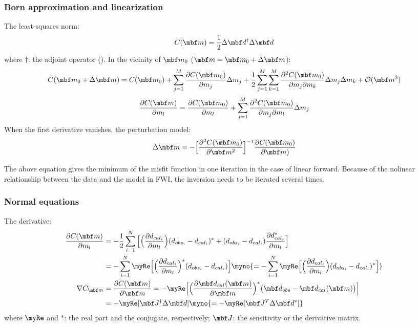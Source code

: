 \subsubsection{Born approximation and linearization}
The least-squares norm:
\[ C(\mbf m)=\frac{1}{2}\Delta\mbf d^\dagger\Delta\mbf d \]
where $\dagger$: the adjoint operator ().
In the vicinity of $\mbf m_0$ ($\mbf m=\mbf m_0+\Delta\mbf m$):
\[ C(\mbf m_0+\Delta\mbf m)=C(\mbf m_0)
  +\sum_{j=1}^M\frac{\partial C(\mbf m_0)}{\partial m_j}\Delta m_j
  +\frac{1}{2}\sum_{j=1}^M\sum_{k=1}^M\frac{\partial^2C(\mbf m_0)}{\partial m_j\partial m_k}\Delta m_j\Delta m_k
  +\mathcal O(\mbf m^3) \]
\[ \frac{\partial C(\mbf m)}{\partial m_l}=\frac{\partial C(\mbf m_0)}{\partial m_l}
  +\sum_{j=1}^M\frac{\partial^2C(\mbf m_0)}{\partial m_j\partial m_l}\Delta m_j \]
When the first derivative vanishes, the perturbation model:
\[ \Delta\mbf m=-\Big[\frac{\partial^2C(\mbf m_0)}{\partial\mbf m^2}\Big]^{-1}
  \frac{\partial C(\mbf m_0)}{\partial\mbf m)} \]

The above equation gives the minimum of the misfit function in one iteration
in the case of linear forward.
Because of the nolinear relationship between the data and the model in FWI,
the inversion needs to be iterated several times.

\subsubsection{Normal equations}
The derivative:
\begin{align*}
  \frac{\partial C(\mbf m)}{\partial m_l} & =-\frac{1}{2}\sum_{i=1}^N
      \Big[\Big(\frac{\partial d_{cal_i}}{\partial m_l}\Big)(d_{obs_i}-d_{cal_i})^*
      +(d_{obs_i}-d_{cal_i})\frac{\partial d_{cal_i}^*}{\partial m_l}\Big] \\
    & =-\sum_{i=1}^N\myRe\Big[\Big(\frac{\partial d_{cal_i}}{\partial m_l}\Big)^*
      (d_{obs_i}-d_{cal_i})\Big]
      \myno{=-\sum_{i=1}^N\myRe\Big[\Big(\frac{\partial d_{cal_i}}{\partial m_l}\Big)
      (d_{obs_i}-d_{cal_i})^*\Big]} \\
  \nabla C_{\mbf m} & =\frac{\partial C(\mbf m)}{\partial\mbf m}
      =-\myRe\Big[\Big(\frac{\partial\mbf d_{cal}(\mbf m)}{\partial\mbf m}\Big)^*
      \big(\mbf d_{obs}-\mbf d_{cal}(\mbf m)\big)\Big] \\
    & =-\myRe[\mbf J^\dagger\Delta\mbf d] \myno{=-\myRe[\mbf J^T\Delta\mbf d^*]}
\end{align*}
where $\myRe$ and $*$: the real part and the conjugate, respectively;
$\mbf J$: the sensitivity or the \Frechet derivative matrix.

